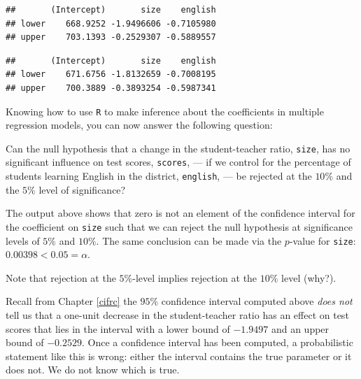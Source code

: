 \documentclass[]{book}
\newenvironment{Shaded}{\begin{snugshade}}{\end{snugshade}}
\newcommand{\KeywordTok}[1]{\textcolor[rgb]{0.13,0.29,0.53}{\textbf{#1}}}
\newcommand{\FloatTok}[1]{\textcolor[rgb]{0.00,0.00,0.81}{#1}}
\newcommand{\StringTok}[1]{\textcolor[rgb]{0.31,0.60,0.02}{#1}}
\newcommand{\CommentTok}[1]{\textcolor[rgb]{0.56,0.35,0.01}{\textit{#1}}}
\newcommand{\OperatorTok}[1]{\textcolor[rgb]{0.81,0.36,0.00}{\textbf{#1}}}
\newcommand{\NormalTok}[1]{#1}
\theoremstyle{definition}
\theoremstyle{definition}
\theoremstyle{definition}
\theoremstyle{remark}
\begin{document}
\begin{verbatim}
##       (Intercept)       size    english
## lower    668.9252 -1.9496606 -0.7105980
## upper    703.1393 -0.2529307 -0.5889557
\end{verbatim}

\begin{Shaded}
\end{Shaded}

\begin{verbatim}
##       (Intercept)       size    english
## lower    671.6756 -1.8132659 -0.7008195
## upper    700.3889 -0.3893254 -0.5987341
\end{verbatim}

Knowing how to use \texttt{R} to make inference about the coefficients
in multiple regression models, you can now answer the following
question:

Can the null hypothesis that a change in the student-teacher ratio,
\texttt{size}, has no significant influence on test scores,
\texttt{scores}, --- if we control for the percentage of students
learning English in the district, \texttt{english}, --- be rejected at
the \(10\%\) and the \(5\%\) level of significance?

The output above shows that zero is not an element of the confidence
interval for the coefficient on \texttt{size} such that we can reject
the null hypothesis at significance levels of \(5\%\) and \(10\%\). The
same conclusion can be made via the \(p\)-value for \texttt{size}:
\(0.00398 < 0.05 = \alpha\).

Note that rejection at the \(5\%\)-level implies rejection at the
\(10\%\) level (why?).

Recall from Chapter \ref{cifrc} the \(95\%\) confidence interval
computed above \emph{does not} tell us that a one-unit decrease in the
student-teacher ratio has an effect on test scores that lies in the
interval with a lower bound of \(-1.9497\) and an upper bound of
\(-0.2529\). Once a confidence interval has been computed, a
probabilistic statement like this is wrong: either the interval contains
the true parameter or it does not. We do not know which is true.
\end{document}
